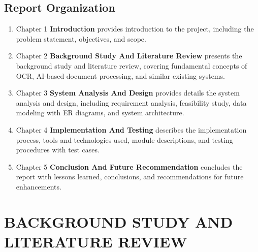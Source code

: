 \documentclass[12pt]{report}
\begin{document}
\section{Report Organization}
\begin{enumerate}[label=\textbullet, leftmargin=*, nosep, itemsep=2pt, topsep=2pt]
\item Chapter 1 \textbf{Introduction} provides introduction to the project, including the problem statement, objectives, and scope.
 \item Chapter 2 \textbf{Background Study And Literature Review} presents the background study and literature review, covering fundamental concepts of OCR, AI-based document processing, and similar existing systems. 
\item Chapter 3 \textbf{System Analysis And Design} provides details the system analysis and design, including requirement analysis, feasibility study, data modeling with ER diagrams, and system architecture. 
\item Chapter 4 \textbf{Implementation And Testing} describes the implementation process, tools and technologies used, module descriptions, and testing procedures with test cases. 
\item Chapter 5 \textbf{Conclusion And Future Recommendation} concludes the report with lessons learned, conclusions, and recommendations for future enhancements.
\end{enumerate}
\newpage
\chapter{BACKGROUND STUDY AND LITERATURE REVIEW}
\end{document}
